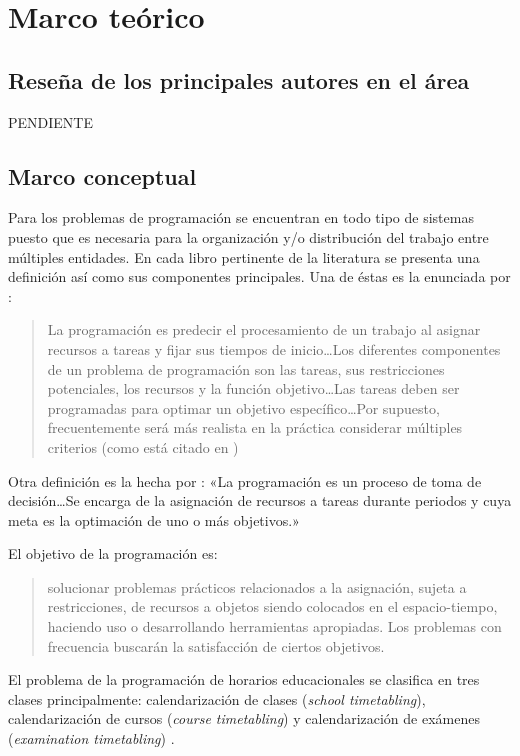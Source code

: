 \documentclass[spanish,draft,12pt,headsepline,footsepline,paper=letter]{scrreprt}
\begin{document}
\section*{Marco teórico}

\subsection*{Reseña de los principales autores en el área}

PENDIENTE

\subsection*{Marco conceptual}

Para \citet[p.~5]{TKindt2002} los problemas de programación se encuentran en todo tipo de sistemas puesto que es necesaria para la organización y/o distribución del trabajo entre múltiples entidades. En cada libro pertinente de la literatura se presenta una definición así como sus componentes principales. Una de éstas es la enunciada por \citet{carlier1988problemes}: 
\begin{quotation}
La programación es predecir el procesamiento de un trabajo al asignar recursos a tareas y fijar sus tiempos de inicio\ldots Los diferentes componentes de un problema de programación son las tareas, sus restricciones potenciales, los recursos y la función objetivo\ldots Las tareas deben ser programadas para optimar un objetivo específico\ldots Por supuesto, frecuentemente será más realista en la práctica considerar múltiples criterios (como está citado en \citealp[p.~6]{TKindt2002}) 
\end{quotation}

Otra definición es la hecha por \citet[p.~1]{Pinedo1995}: «La programación es un proceso de toma de decisión\ldots  Se encarga de la asignación de recursos a tareas durante periodos y cuya meta es la optimación de uno o más objetivos.»

El objetivo de la programación es:

\begin{quotation}
  solucionar problemas prácticos relacionados a la asignación, sujeta a restricciones, de recursos a objetos siendo colocados en el espacio-tiempo, haciendo uso o desarrollando herramientas apropiadas. Los problemas con frecuencia buscarán la satisfacción de ciertos objetivos.
\end{quotation}


El problema de la programación de horarios educacionales se clasifica en tres clases principalmente:
calendarización de clases (\textit{school timetabling}),
calendarización de cursos (\textit{course timetabling}) y
calendarización de exámenes (\textit{examination timetabling}) \citep[p.~88]{schaerf99a-survey-of-automated}.
\end{document}
